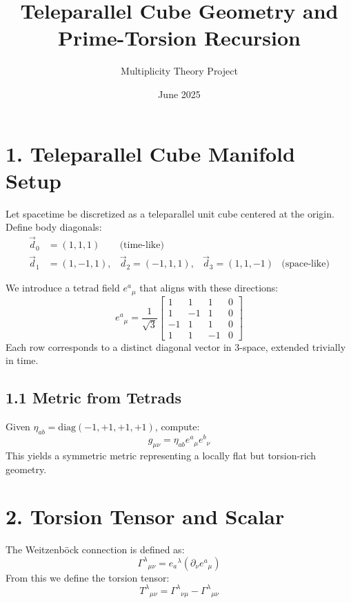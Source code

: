 \documentclass{article}
\title{Teleparallel Cube Geometry and Prime-Torsion Recursion}
\author{Multiplicity Theory Project}
\date{June 2025}
\begin{document}
\maketitle

\section*{1. Teleparallel Cube Manifold Setup}

Let spacetime be discretized as a teleparallel unit cube centered at the origin. Define body diagonals:
\begin{align*}
\vec{d}_0 &= (1,1,1) &\text{(time-like)} \\
\vec{d}_1 &= (1,-1,1), &\vec{d}_2 = (-1,1,1), &\vec{d}_3 = (1,1,-1) &\text{(space-like)}
\end{align*}

We introduce a tetrad field $e^a{}_{\mu}$ that aligns with these directions:
\begin{equation}
    e^a{}_{\mu} = \frac{1}{\sqrt{3}}
    \begin{bmatrix}
        1 & 1 & 1 & 0 \\
        1 & -1 & 1 & 0 \\
        -1 & 1 & 1 & 0 \\
        1 & 1 & -1 & 0
    \end{bmatrix}
\end{equation}
Each row corresponds to a distinct diagonal vector in 3-space, extended trivially in time.

\subsection*{1.1 Metric from Tetrads}

Given $\eta_{ab} = \text{diag}(-1,+1,+1,+1)$, compute:
\begin{equation}
    g_{\mu\nu} = \eta_{ab} e^a{}_{\mu} e^b{}_{\nu}
\end{equation}
This yields a symmetric metric representing a locally flat but torsion-rich geometry.

\section*{2. Torsion Tensor and Scalar}

The Weitzenb\"ock connection is defined as:
\begin{equation}
    \Gamma^\lambda{}_{\mu\nu} = e_a{}^\lambda (\partial_\nu e^a{}_{\mu})
\end{equation}
From this we define the torsion tensor:
\begin{equation}
    T^\lambda{}_{\mu\nu} = \Gamma^\lambda{}_{\nu\mu} - \Gamma^\lambda{}_{\mu\nu}
\end{equation}
\end{document}
